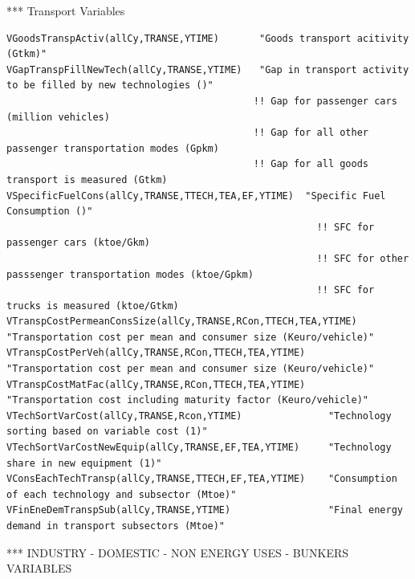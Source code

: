 \documentclass[a4paper,]{scrartcl}
\begin{document}
*** Transport Variables

\begin{lstlisting}
VGoodsTranspActiv(allCy,TRANSE,YTIME)       "Goods transport acitivity (Gtkm)"  
VGapTranspFillNewTech(allCy,TRANSE,YTIME)   "Gap in transport activity to be filled by new technologies ()"
                                           !! Gap for passenger cars (million vehicles)
                                           !! Gap for all other passenger transportation modes (Gpkm)
                                           !! Gap for all goods transport is measured (Gtkm)    
VSpecificFuelCons(allCy,TRANSE,TTECH,TEA,EF,YTIME)  "Specific Fuel Consumption ()"
                                                      !! SFC for passenger cars (ktoe/Gkm)
                                                      !! SFC for other passsenger transportation modes (ktoe/Gpkm)
                                                      !! SFC for trucks is measured (ktoe/Gtkm)
VTranspCostPermeanConsSize(allCy,TRANSE,RCon,TTECH,TEA,YTIME)   "Transportation cost per mean and consumer size (Keuro/vehicle)"
VTranspCostPerVeh(allCy,TRANSE,RCon,TTECH,TEA,YTIME)    "Transportation cost per mean and consumer size (Keuro/vehicle)"
VTranspCostMatFac(allCy,TRANSE,RCon,TTECH,TEA,YTIME)    "Transportation cost including maturity factor (Keuro/vehicle)" 
VTechSortVarCost(allCy,TRANSE,Rcon,YTIME)               "Technology sorting based on variable cost (1)" 
VTechSortVarCostNewEquip(allCy,TRANSE,EF,TEA,YTIME)     "Technology share in new equipment (1)" 
VConsEachTechTransp(allCy,TRANSE,TTECH,EF,TEA,YTIME)    "Consumption of each technology and subsector (Mtoe)"
VFinEneDemTranspSub(allCy,TRANSE,YTIME)                 "Final energy demand in transport subsectors (Mtoe)"                
\end{lstlisting}

*** INDUSTRY - DOMESTIC - NON ENERGY USES - BUNKERS VARIABLES
\end{document}
